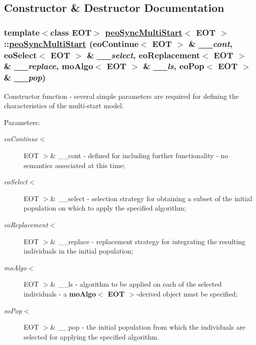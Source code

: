 \subsection{Constructor \& Destructor Documentation}
\hypertarget{classpeoSyncMultiStart_d29f94aad3c1f443bfffc8b6aee0704c}{
\subsubsection[peoSyncMultiStart]{\setlength{\rightskip}{0pt plus 5cm}template$<$class EOT$>$ \hyperlink{classpeoSyncMultiStart}{peo\-Sync\-Multi\-Start}$<$ EOT $>$::\hyperlink{classpeoSyncMultiStart}{peo\-Sync\-Multi\-Start} (eo\-Continue$<$ EOT $>$ \& {\em \_\-\_\-cont}, eo\-Select$<$ EOT $>$ \& {\em \_\-\_\-select}, eo\-Replacement$<$ EOT $>$ \& {\em \_\-\_\-replace}, \bf{mo\-Algo}$<$ EOT $>$ \& {\em \_\-\_\-ls}, eo\-Pop$<$ EOT $>$ \& {\em \_\-\_\-pop})}}
\label{classpeoSyncMultiStart_d29f94aad3c1f443bfffc8b6aee0704c}


Constructor function - several simple parameters are required for defining the characteristics of the multi-start model. 

\begin{Desc}
\item[Parameters:]
\begin{description}
\item[{\em eo\-Continue$<$}]EOT $>$\& \_\-\_\-cont - defined for including further functionality - no semantics associated at this time; \item[{\em eo\-Select$<$}]EOT $>$\& \_\-\_\-select - selection strategy for obtaining a subset of the initial population on which to apply the specified algorithm; \item[{\em eo\-Replacement$<$}]EOT $>$\& \_\-\_\-replace - replacement strategy for integrating the resulting individuals in the initial population; \item[{\em mo\-Algo$<$}]EOT $>$\& \_\-\_\-ls - algorithm to be applied on each of the selected individuals - a {\bf mo\-Algo$<$ EOT $>$}-derived object must be specified; \item[{\em eo\-Pop$<$}]EOT $>$\& \_\-\_\-pop - the initial population from which the individuals are selected for applying the specified algorithm. \end{description}
\end{Desc}


